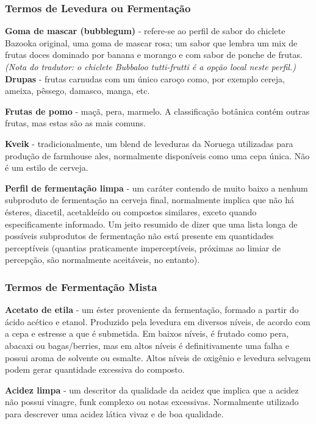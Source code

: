 \subsubsection*{Termos de Levedura ou Fermentação}
\textbf{Goma de mascar (bubblegum)} - refere-se ao perfil de sabor do chiclete Bazooka original, uma goma de mascar rosa; um sabor que lembra um mix de frutas doces dominado por banana e morango e com sabor de ponche de frutas.
\textit{(Nota do tradutor: o chiclete Bubbaloo tutti-frutti é a opção local neste perfil.)}\\

\textbf{Drupas} - frutas carnudas com um único caroço como, por exemplo cereja, ameixa, pêssego, damasco, manga, etc.

\textbf{Frutas de pomo} - maçã, pera, marmelo. A classificação botânica contém outras frutas, mas estas são as mais comuns.

\textbf{Kveik} - tradicionalmente, um blend de leveduras da Noruega utilizadas para produção de farmhouse ales, normalmente disponíveis como uma cepa única. Não é um estilo de cerveja.

\textbf{Perfil de fermentação limpa} - um caráter contendo de muito baixo a nenhum subproduto de fermentação na cerveja final, normalmente implica que não há ésteres, diacetil, acetaldeído ou compostos similares, exceto quando especificamente informado. Um jeito resumido de dizer que uma lista longa de possíveis subprodutos de fermentação não está presente em quantidades perceptíveis (quantias praticamente imperceptíveis, próximas ao limiar de percepção, são normalmente aceitáveis, no entanto).

\subsubsection*{Termos de Fermentação Mista}
\textbf{Acetato de etila} - um éster proveniente da fermentação, formado a partir do ácido acético e etanol. Produzido pela levedura em diversos níveis, de acordo com a cepa e estresse a que é submetida. Em baixos níveis, é frutado como pera, abacaxi ou bagas/berries, mas em altos níveis é definitivamente uma falha e possui aroma de solvente ou esmalte. Altos níveis de oxigênio e levedura selvagem podem gerar quantidade excessiva do composto.

\textbf{Acidez limpa} - um descritor da qualidade da acidez que implica que a acidez não possui vinagre, funk complexo ou notas excessivas. Normalmente utilizado para descrever uma acidez lática vivaz e de boa qualidade.

